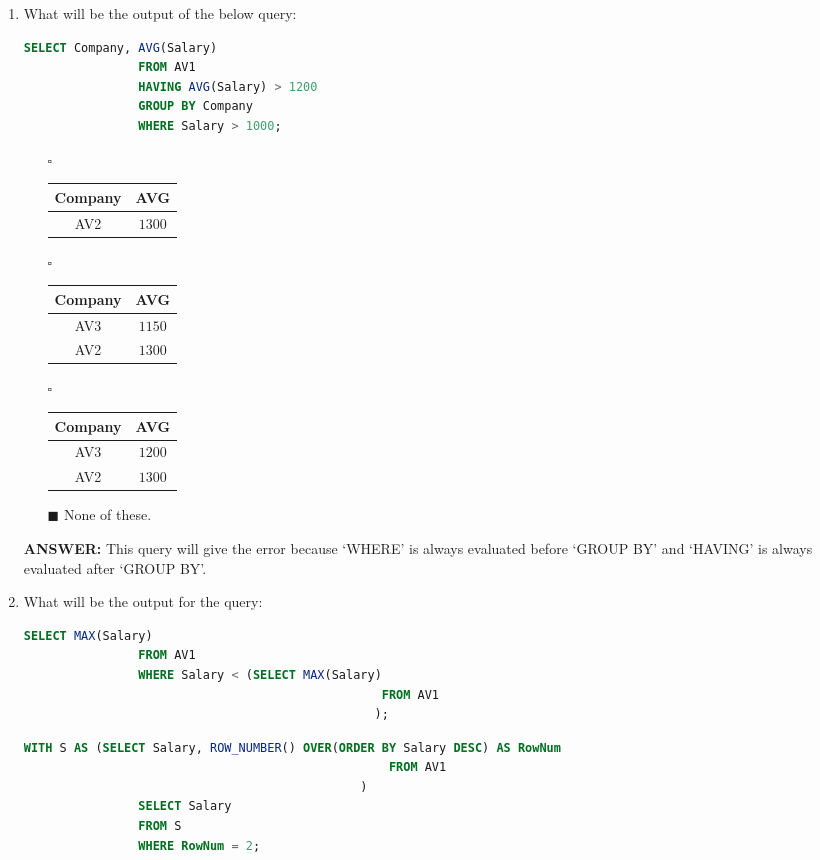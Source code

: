 \documentclass[10pt]{article}
\newcommand{\lightrule}{%
	\arrayrulecolor{black!30}%
	\midrule[\lightrulewidth]%
	\arrayrulecolor{black}}
\begin{document}
\begin{enumerate}
		\newpage

		\item What will be the output of the below query: 
			\begin{lstlisting}[language=SQL,firstline=1, lastline=5] 
				SELECT Company, AVG(Salary) 
				FROM AV1 
				HAVING AVG(Salary) > 1200 
				GROUP BY Company 
				WHERE Salary > 1000;
			\end{lstlisting}
		
			\begin{enumerate}
				\item[$\square$]
					\begin{tabular}{@{} *{2}{c} @{}}
						\toprule
							\textbf{Company} & \textbf{AVG} \\
						\midrule
							AV2 & $1300$ \\
						\bottomrule
					\end{tabular}

				\item[$\square$]
					\begin{tabular}{@{} *{2}{c} @{}}
						\toprule
							\textbf{Company} & \textbf{AVG} \\
						\midrule
							AV3 & $1150$ \\
						\lightrule
							AV2 & $1300$ \\
						\bottomrule
					\end{tabular}

				\item[$\square$]
					\begin{tabular}{@{} *{2}{c} @{}}
						\toprule
							\textbf{Company} & \textbf{AVG} \\
						\midrule
							AV3 & $1200$ \\
						\lightrule
							AV2 & $1300$ \\
						\bottomrule
					\end{tabular}

				\item[$\blacksquare$] None of these.
			\end{enumerate}
			\color{red} \textbf{ANSWER:} \color{black} This query will give the error because ‘WHERE’ is always evaluated before ‘GROUP BY’ and ‘HAVING’ is always evaluated after ‘GROUP BY’.

		\item What will be the output for the query:
			\begin{lstlisting}[language=SQL,firstline=1, lastline=5] 
				SELECT MAX(Salary) 
				FROM AV1 
				WHERE Salary < (SELECT MAX(Salary) 
										          FROM AV1 
										         );
			\end{lstlisting}
			\begin{lstlisting}[language=SQL,firstline=1, lastline=6] 
				WITH S AS (SELECT Salary, ROW_NUMBER() OVER(ORDER BY Salary DESC) AS RowNum 
												   FROM AV1
											   ) 
				SELECT Salary 
				FROM S 
				WHERE RowNum = 2;
			\end{lstlisting}


\end{enumerate}
\end{document}
